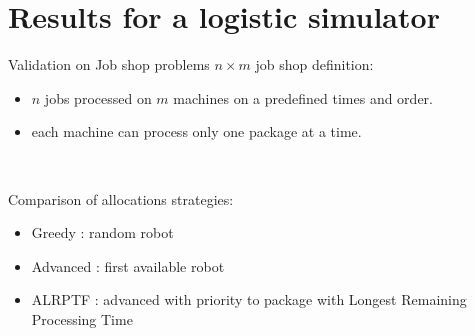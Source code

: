 \section{Results for a logistic simulator}

\begin{frame}[fragile]{Validation on Job shop problems}
$n\times m$ job shop definition:
\begin{itemize}
    \item $n$ jobs processed on $m$ machines on a predefined times and order.
    \item each machine can process only one package at a time.
\end{itemize}

~~



Comparison of allocations strategies:
\begin{itemize}
    \item Greedy : random robot
    \item Advanced : first available robot
    \item ALRPTF : advanced with priority to package with Longest Remaining Processing Time
\end{itemize}
\end{frame}

\newcommand{\calcrowmean}{
    \def \rowmean{0}
    \pgfmathparse{\pgfkeysvalueof{/pgfplots/table/summary statistics/end index}-\pgfkeysvalueof{/pgfplots/table/summary statistics/start index}+1}
    \edef\numberofcols{\pgfmathresult}
    \pgfplotsforeachungrouped \col in {1,2,3,4,5,6,7,8,9,10}%
    {
        
        \typeout{col = \col}
        
        \pgfmathparse{\rowmean+\thisrowno{\col}/\numberofcols}
        \edef \rowmean{\pgfmathresult}
    }
}
\newcommand{\calcstddev}{
    \def\rowstddev{0}
    \calcrowmean
    \pgfplotsforeachungrouped \col in {1,2,3,4,5,6,7,8,9,10}
    {
        \pgfmathparse{\rowstddev+(\thisrowno{\col}-\rowmean)^2/(\numberofcols-1)}
        \edef\rowstddev{\pgfmathresult}
    }
    \pgfmathparse{sqrt(\rowstddev)}
}
\newcommand{\calcstderror}{
    \calcrowmean
    \calcstddev
    \pgfmathparse{sqrt(\rowstddev)/sqrt(\numberofcols)}
}

